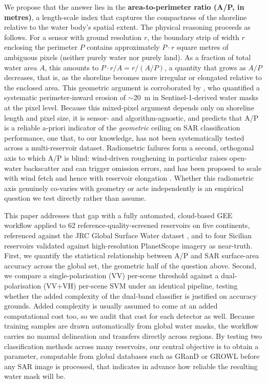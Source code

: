 We propose that the answer lies in the \textbf{area-to-perimeter ratio
(A/P, in metres)}, a length-scale index that captures the compactness of
the shoreline relative to the water body's spatial extent. The physical
reasoning proceeds as follows. For a sensor with ground resolution $r$,
the boundary strip of width $r$ enclosing the perimeter $P$ contains
approximately $P \cdot r$ square metres of ambiguous pixels (neither
purely water nor purely land). As a fraction of total water area $A$,
this amounts to $P \cdot r / A = r / (A/P)$, a quantity that grows as
$A/P$ decreases, that is, as the shoreline becomes more irregular or
elongated relative to the enclosed area. This geometric argument is
corroborated by \citet{PenaLuque2021}, who quantified a systematic
perimeter-inward erosion of $\sim$20~m in Sentinel-1-derived water masks
at the pixel level. Because this mixed-pixel argument depends only on
shoreline length and pixel size, it is sensor- and algorithm-agnostic, and
predicts that A/P is a reliable a-priori indicator of
the \emph{geometric} ceiling on SAR classification performance, one that,
to our knowledge, has not been systematically tested across a multi-reservoir
dataset. Radiometric failures form a second, orthogonal axis to which A/P is
blind: wind-driven roughening in particular raises open-water backscatter and
can trigger omission errors, and has been proposed to scale with wind fetch
and hence with reservoir elongation \citep{McQuillan2025}. Whether this
radiometric axis genuinely co-varies with geometry or acts independently is an
empirical question we test directly rather than assume.

This paper addresses that gap with a fully automated, cloud-based GEE
workflow applied to 62 reference-quality-screened reservoirs on five
continents, referenced against the
JRC Global Surface Water dataset \citep{Pekel2016}, and to four Sicilian
reservoirs validated against high-resolution PlanetScope imagery as near-truth.
First, we quantify the statistical relationship between A/P and SAR
surface-area accuracy across the global set, the geometric half of the
question above. Second, we compare a single-polarisation (VV) per-scene
threshold against a dual-polarisation (VV+VH) per-scene SVM under an
identical pipeline, testing whether the added complexity of the dual-band
classifier is justified on accuracy grounds. Added complexity is usually
assumed to come at an added computational cost too, so we audit that cost for
each detector as well. Because training samples are drawn automatically from
global water masks, the workflow carries no manual delineation and transfers
directly across regions. By testing two classification methods across many
reservoirs, our central objective is to obtain a parameter, computable from
global databases such as GRanD or GROWL before any SAR image is processed,
that indicates in advance how reliable the resulting water mask will be.


